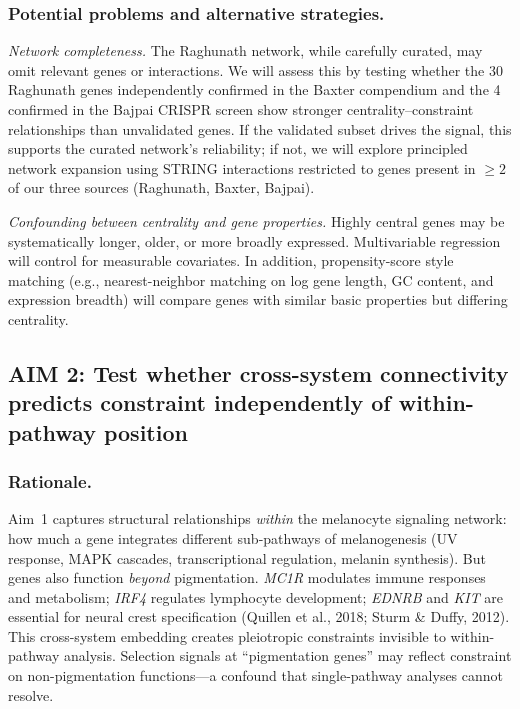 \documentclass[11pt]{article}
\begin{document}
\subsubsection{Potential problems and alternative strategies.}

\emph{Network completeness.} The Raghunath network, while carefully curated, may omit relevant genes or interactions. We will assess this by testing whether the 30 Raghunath genes independently confirmed in the Baxter compendium and the 4 confirmed in the Bajpai CRISPR screen show stronger centrality--constraint relationships than unvalidated genes. If the validated subset drives the signal, this supports the curated network's reliability; if not, we will explore principled network expansion using STRING interactions restricted to genes present in $\geq 2$ of our three sources (Raghunath, Baxter, Bajpai).

\emph{Confounding between centrality and gene properties.} Highly central genes may be systematically longer, older, or more broadly expressed. Multivariable regression will control for measurable covariates. In addition, propensity-score style matching (e.g., nearest-neighbor matching on log gene length, GC content, and expression breadth) will compare genes with similar basic properties but differing centrality.

\subsection{AIM 2: Test whether cross-system connectivity predicts constraint independently of within-pathway position}

\subsubsection{Rationale.}
Aim~1 captures structural relationships \emph{within} the melanocyte signaling network: how much a gene integrates different sub-pathways of melanogenesis (UV response, MAPK cascades, transcriptional regulation, melanin synthesis). But genes also function \emph{beyond} pigmentation. \emph{MC1R} modulates immune responses and metabolism; \emph{IRF4} regulates lymphocyte development; \emph{EDNRB} and \emph{KIT} are essential for neural crest specification (Quillen et al., 2018; Sturm \& Duffy, 2012). This cross-system embedding creates pleiotropic constraints invisible to within-pathway analysis. Selection signals at ``pigmentation genes'' may reflect constraint on non-pigmentation functions---a confound that single-pathway analyses cannot resolve.
\end{document}
